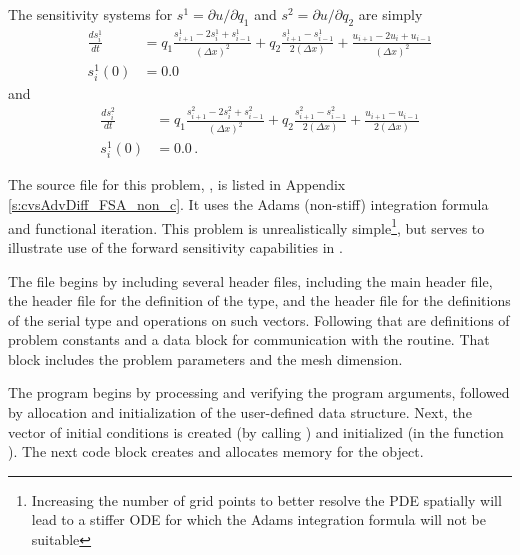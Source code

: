The sensitivity systems for $s^1 = \partial u / \partial q_1$ and
$s^2 = \partial u / \partial q_2$ are simply
\begin{equation}\label{e:cvsAdvDiff_FSA_non_S1}
  \begin{split}
    \frac{d s^1_i}{dt} 
    &= q_1 \frac{s^1_{i+1}-2s^1_{i}+s^1_{i-1}}{(\Delta x)^{2}}
    + q_2 \frac{s^1_{i+1}-s^1_{i-1}}{2(\Delta x)} 
    + \frac{u_{i+1}-2u_{i}+u_{i-1}}{(\Delta x)^{2}} \\
    s^1_i (0) &= 0.0 
  \end{split}
\end{equation}
and
\begin{equation}\label{e:cvsAdvDiff_FSA_non_S2}
  \begin{split}
    \frac{d s^2_i}{dt} 
    &= q_1 \frac{s^2_{i+1}-2s^2_{i}+s^2_{i-1}}{(\Delta x)^{2}}
    + q_2 \frac{s^2_{i+1}-s^2_{i-1}}{2(\Delta x)} 
    + \frac{u_{i+1}-u_{i-1}}{2(\Delta x)} \\
    s^1_i (0) &= 0.0  \, .
  \end{split}
\end{equation}

The source file for this problem, , is listed in Appendix
\ref{s:cvsAdvDiff_FSA_non_c}.  It uses the Adams (non-stiff) integration formula and
functional iteration.  This problem is unrealistically 
simple\footnote{Increasing the number of grid points to better resolve the PDE spatially
will lead to a stiffer ODE for which the Adams integration formula will not
be suitable}, but serves to illustrate use of the forward sensitivity 
capabilities in {\cvodes}.

The  file begins by including several header files, including 
the main {\cvodes} header file, the  header file for the
definition of the  type, and the {\nvecs} header file 
for the definitions of the serial  type and operations on such vectors.
Following that are definitions of problem constants and a data block for communication
with the  routine.  That block includes the problem parameters and the mesh 
dimension.

The  program begins by processing and verifying the program arguments,
followed by allocation and initialization of the user-defined data structure. Next, the
vector of initial conditions is created (by calling ) and
initialized (in the function ). The next code block creates and allocates
memory for the {\cvodes} object. 

